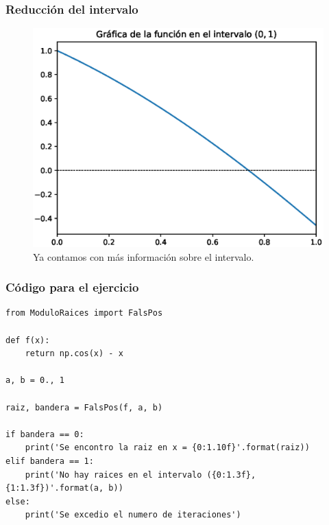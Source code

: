 \begin{frame}
\frametitle{Reducción del intervalo}
\begin{figure}[h!]
	\centering
	\includegraphics[scale=0.5]{Imagenes/raices_falsaposicion_02.eps}
	\caption{Ya contamos con más información sobre el intervalo.}
\end{figure}
\end{frame}
\begin{frame}
\frametitle{Código para el ejercicio}
\begin{lstlisting}[caption=Código para resolver el ejercicio, style=codigopython]
from ModuloRaices import FalsPos

def f(x):
	return np.cos(x) - x

a, b = 0., 1

raiz, bandera = FalsPos(f, a, b)

if bandera == 0:
	print('Se encontro la raiz en x = {0:1.10f}'.format(raiz))
elif bandera == 1:
	print('No hay raices en el intervalo ({0:1.3f}, {1:1.3f})'.format(a, b))
else:
	print('Se excedio el numero de iteraciones')
\end{lstlisting}
\end{frame}
